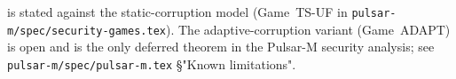 \begin{remark}
 is stated against the static-corruption
model (Game~TS-UF in \texttt{pulsar-m/spec/security-games.tex}). The
adaptive-corruption variant (Game~ADAPT) is open and is the only
deferred theorem in the Pulsar-M security analysis; see
\texttt{pulsar-m/spec/pulsar-m.tex} \S "Known limitations".
\end{remark}
